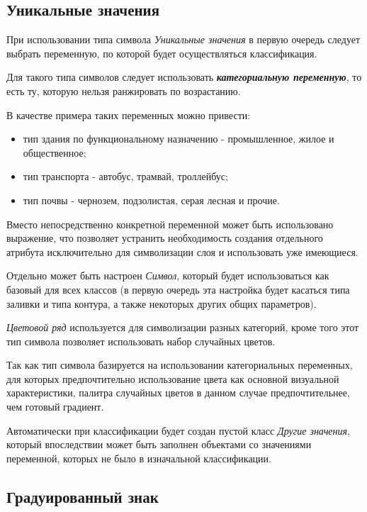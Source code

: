 \documentclass[
  russian,
  letterpaper,
  DIV=11,
  numbers=noendperiod]{scrartcl}
\begin{document}
\subsection{Уникальные
значения}\label{ux443ux43dux438ux43aux430ux43bux44cux43dux44bux435-ux437ux43dux430ux447ux435ux43dux438ux44f}

При использовании типа символа \emph{Уникальные значения} в первую
очередь следует выбрать переменную, по которой будет осуществляться
классификация.

Для такого типа символов следует использовать
\textbf{\emph{категориальную переменную}}, то есть ту, которую нельзя
ранжировать по возрастанию.

В качестве примера таких переменных можно привести:

\begin{itemize}
\item
  тип здания по функциональному назначению - промышленное, жилое и
  общественное;
\item
  тип транспорта - автобус, трамвай, троллейбус;
\item
  тип почвы - чернозем, подзолистая, серая лесная и прочие.
\end{itemize}

Вместо непосредственно конкретной переменной может быть использовано
выражение, что позволяет устранить необходимость создания отдельного
атрибута исключительно для символизации слоя и использовать уже
имеющиеся.

Отдельно может быть настроен \emph{Символ}, который будет использоваться
как базовый для всех классов (в первую очередь эта настройка будет
касаться типа заливки и типа контура, а также некоторых других общих
параметров).

\emph{Цветовой ряд} используется для символизации разных категорий,
кроме того этот тип символа позволяет использовать набор случайных
цветов.

Так как тип символа базируется на использовании категориальных
переменных, для которых предпочтительно использование цвета как основной
визуальной характеристики, палитра случайных цветов в данном случае
предпочтительнее, чем готовый градиент.

Автоматически при классификации будет создан пустой класс \emph{Другие
значения}, который впоследствии может быть заполнен объектами со
значениями переменной, которых не было в изначальной классификации.

\subsection{Градуированный
знак}\label{ux433ux440ux430ux434ux443ux438ux440ux43eux432ux430ux43dux43dux44bux439-ux437ux43dux430ux43a}
\end{document}
